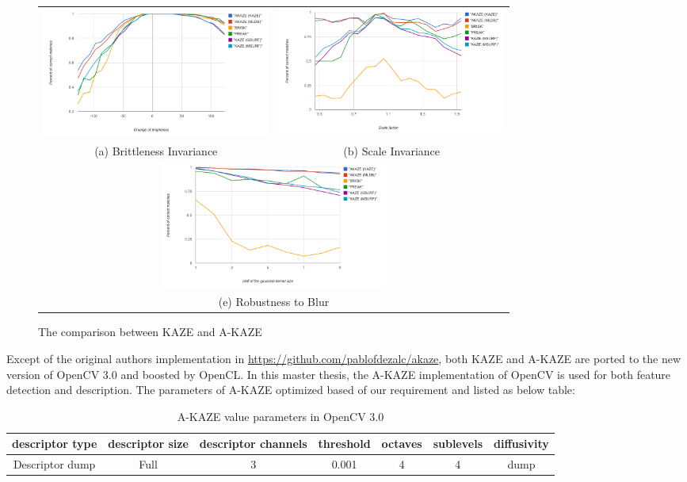 \begin{figure}[H]
\begin{tabular}{cc}
  \includegraphics[width=75mm]{figures/brithness_akaze} &  \includegraphics[width=75mm]{figures/scale_akaze} \\
(a) Brittleness Invariance & (b) Scale Invariance \\[6pt]
\multicolumn{2}{c}{\includegraphics[width=75mm]{figures/blur_akaze} }\\
\multicolumn{2}{c}{(e) Robustness to Blur}
\end{tabular}
\caption{The comparison between KAZE and A-KAZE}\label{fig:compare_kaze_and_A-kaze}
\end{figure}

Except of the original authors implementation in \url{https://github.com/pablofdezalc/akaze}, both KAZE and A-KAZE are ported to the new version of OpenCV 3.0 and boosted by OpenCL. In this master thesis, the A-KAZE implementation of OpenCV is used for both feature detection and description. The parameters of A-KAZE optimized based of our requirement and listed as below table:

\begin{table}[H]
  \caption{A-KAZE value parameters in OpenCV 3.0}
  \begin{tabular}{| c | c | c | c | c | c | c |}
      \hline
      descriptor type & descriptor size & descriptor channels & threshold & octaves & sublevels & diffusivity \\ \hline \hline
      Descriptor dump & Full & 3 & 0.001 & 4 & 4 & dump \\ \hline
  \end{tabular}
\end{table}

